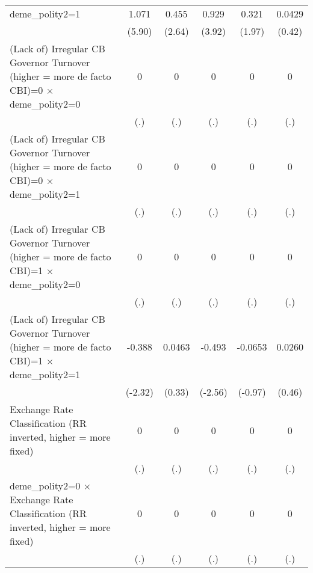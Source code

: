 {\begin{tabular*}{\linewidth}{@{\hskip\tabcolsep\extracolsep\fill}l*{5}{c}}
\addlinespace
deme\_polity2=1  &    1.071\sym{***}&    0.455\sym{**} &    0.929\sym{***}&    0.321         &   0.0429         \\
                &   (5.90)         &   (2.64)         &   (3.92)         &   (1.97)         &   (0.42)         \\
\addlinespace
(Lack of) Irregular CB Governor Turnover (higher = more de facto CBI)=0 $\times$ deme\_polity2=0&        0         &        0         &        0         &        0         &        0         \\
                &      (.)         &      (.)         &      (.)         &      (.)         &      (.)         \\
\addlinespace
(Lack of) Irregular CB Governor Turnover (higher = more de facto CBI)=0 $\times$ deme\_polity2=1&        0         &        0         &        0         &        0         &        0         \\
                &      (.)         &      (.)         &      (.)         &      (.)         &      (.)         \\
\addlinespace
(Lack of) Irregular CB Governor Turnover (higher = more de facto CBI)=1 $\times$ deme\_polity2=0&        0         &        0         &        0         &        0         &        0         \\
                &      (.)         &      (.)         &      (.)         &      (.)         &      (.)         \\
\addlinespace
(Lack of) Irregular CB Governor Turnover (higher = more de facto CBI)=1 $\times$ deme\_polity2=1&   -0.388\sym{*}  &   0.0463         &   -0.493\sym{*}  &  -0.0653         &   0.0260         \\
                &  (-2.32)         &   (0.33)         &  (-2.56)         &  (-0.97)         &   (0.46)         \\
\addlinespace
Exchange Rate Classification (RR inverted, higher = more fixed)&        0         &        0         &        0         &        0         &        0         \\
                &      (.)         &      (.)         &      (.)         &      (.)         &      (.)         \\
\addlinespace
deme\_polity2=0 $\times$ Exchange Rate Classification (RR inverted, higher = more fixed)&        0         &        0         &        0         &        0         &        0         \\
                &      (.)         &      (.)         &      (.)         &      (.)         &      (.)         \\

\end{tabular*}}
